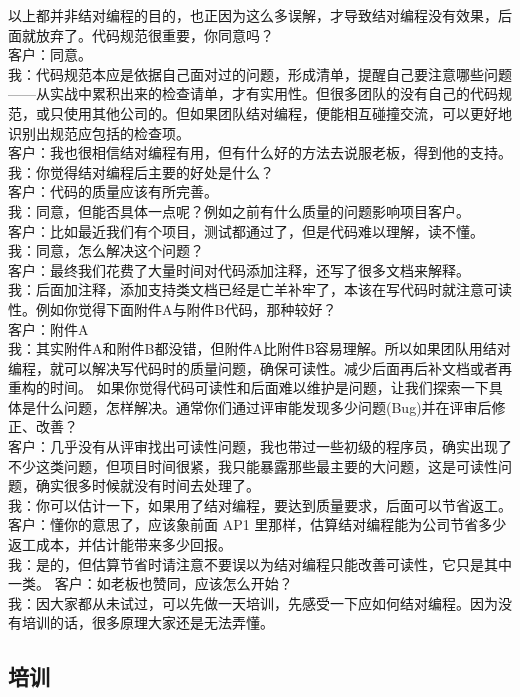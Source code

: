 以上都并非结对编程的目的，也正因为这么多误解，才导致结对编程没有效果，后面就放弃了。代码规范很重要，你同意吗？\\
客户：同意。\\
我：代码规范本应是依据自己面对过的问题，形成清单，提醒自己要注意哪些问题------从实战中累积出来的检查请单，才有实用性。但很多团队的没有自己的代码规范，或只使用其他公司的。但如果团队结对编程，便能相互碰撞交流，可以更好地识别出规范应包括的检查项。\\
客户：我也很相信结对编程有用，但有什么好的方法去说服老板，得到他的支持。\\
我：你觉得结对编程后主要的好处是什么？\\
客户：代码的质量应该有所完善。\\
我：同意，但能否具体一点呢？例如之前有什么质量的问题影响项目客户。\\
客户：比如最近我们有个项目，测试都通过了，但是代码难以理解，读不懂。\\
我：同意，怎么解决这个问题？\\
客户：最终我们花费了大量时间对代码添加注释，还写了很多文档来解释。\\
我：后面加注释，添加支持类文档已经是亡羊补牢了，本该在写代码时就注意可读性。例如你觉得下面附件A与附件B代码，那种较好？\\
客户：附件A\\
我：其实附件A和附件B都没错，但附件A比附件B容易理解。所以如果团队用结对编程，就可以解决写代码时的质量问题，确保可读性。减少后面再后补文档或者再重构的时间。
如果你觉得代码可读性和后面难以维护是问题，让我们探索一下具体是什么问题，怎样解决。通常你们通过评审能发现多少问题(Bug)并在评审后修正、改善？\\
客户：几乎没有从评审找出可读性问题，我也带过一些初级的程序员，确实出现了不少这类问题，但项目时间很紧，我只能暴露那些最主要的大问题，这是可读性问题，确实很多时候就没有时间去处理了。\\
我：你可以估计一下，如果用了结对编程，要达到质量要求，后面可以节省返工。\\
客户：懂你的意思了，应该象前面 AP1
里那样，估算结对编程能为公司节省多少返工成本，并估计能带来多少回报。\\
我：是的，但估算节省时请注意不要误以为结对编程只能改善可读性，它只是其中一类。
客户：如老板也赞同，应该怎么开始？\\
我：因大家都从未试过，可以先做一天培训，先感受一下应如何结对编程。因为没有培训的话，很多原理大家还是无法弄懂。\\

\hypertarget{ux57f9ux8bad}{%
\subsection{培训}\label{ux57f9ux8bad}}

